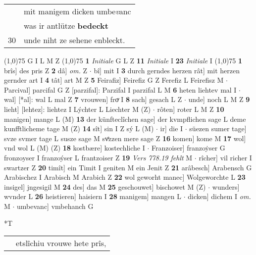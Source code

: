 \documentclass[8pt,a4paper,notitlepage]{article}
\begin{document}
\begin{table}[ht]
\begin{minipage}[t]{0.5\linewidth}
\begin{tabular}{rl}
 & mit manigem dicken umbe\textit{v}anc\\ 
 & was ir antlütze \textbf{bedeckt}\\ 
30 & unde niht ze sehene enbleckt.\\ 
\end{tabular}
\scriptsize
\line(1,0){75} \newline
G I L M Z \newline
\line(1,0){75} \newline
\textbf{1} \textit{Initiale} G L Z  \textbf{11} \textit{Initiale} I  \textbf{23} \textit{Initiale} I  \newline
\line(1,0){75} \newline
\textbf{1} brîs] des pris Z \textbf{2} dâ] \textit{om.} Z  $\cdot$ bî] mit I \textbf{3} durch gerndes herzen rât] mit herzen gernder art I \textbf{4} tât] art M Z \textbf{5} Feirafiz] Feirefiz G Z Ferefiz L Feirefisz M  $\cdot$ Parcival] parcifal G Z [parzifal]: Parzifal I parzifal L M \textbf{6} heten liehtev mal I  $\cdot$ wal] [*al]: wal L mal Z \textbf{7} vrouwen] froͮ I \textbf{8} sach] gesach L Z  $\cdot$ unde] noch L M Z \textbf{9} lieht] [lehtez]: liehtez I Lýchter L Liechter M (Z)  $\cdot$ rôten] roter L M Z \textbf{10} manigen] mange L (M) \textbf{13} der künfteclîchen sage] der kvmpflichen sage L deme kunfftlicheme tage M (Z) \textbf{14} sît] sin I Z sý L (M)  $\cdot$ ir] die I  $\cdot$ süezen sumer tage] svze svmer tage L susze sage M svͤzzen mere sage Z \textbf{16} komen] kome M \textbf{17} wol] vnd wol L (M) (Z) \textbf{18} kostbære] kostechliche I  $\cdot$ Franzoiser] franzoẏser G fronzoyser I franzoýser L frantzoiser Z \textbf{19} \textit{Vers 778.19 fehlt} M   $\cdot$ rîcher] vil richer I swartzer Z \textbf{20} timît] ein Timit I geniten M ein Jenit Z \textbf{21} arâbesch] Arabensch G Arabischez I Arabisch M Arabich Z \textbf{22} wol geworht manec] Wolgeworchte L \textbf{23} insigel] jngesigil M \textbf{24} des] das M \textbf{25} geschouwet] bischowet M (Z)  $\cdot$ wunders] wvnder L \textbf{26} heistieren] haisiern I \textbf{28} manigem] mangen L  $\cdot$ dicken] dichem I \textit{om.} M  $\cdot$ umbevanc] vmbehanch G \newline
\end{minipage}
\hspace{0.5cm}
\begin{minipage}[t]{0.5\linewidth}
\small
\begin{center}*T
\end{center}
\begin{tabular}{rl}
 & etslîchiu vrouwe hete prîs,\\ 

\end{tabular}
\end{minipage}
\end{table}
\end{document}
